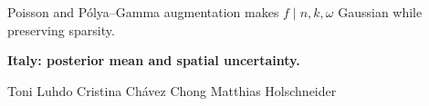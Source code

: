 \documentclass[aspectratio=169]{beamer}
\begin{document}
\begin{frame}[plain,t]
{\begin{minipage}[t][6.48cm][t]{9.42cm}
{{\begin{minipage}[t][6.22cm][t]{8.88cm}
      {\sffamily\fontsize{10}{12}\selectfont
       Poisson and P\'olya--Gamma augmentation makes $f\mid n,k,\omega$
       Gaussian while preserving sparsity.\par}
      \vspace{0.06cm}
      {\color{upblue}\sffamily\bfseries\fontsize{10}{12}\selectfont
       Italy: posterior mean and spatial uncertainty.\par}
      \vfill
      {\color{upblue}\sffamily\fontsize{8}{10}\selectfont
       Toni Luhdo \quad Cristina Ch\'avez Chong \quad Matthias Holschneider\par}
      \vspace{0.12cm}
    \end{minipage}%
  }}%
  \end{minipage}%
  \hfil
}\par
\end{frame}
\end{document}

